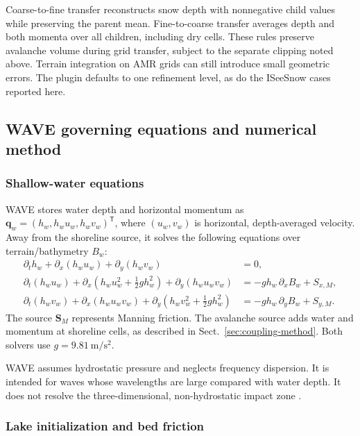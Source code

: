 \documentclass[11pt,a4paper]{article}
\begin{document}
Coarse-to-fine transfer reconstructs snow depth with nonnegative child
values while preserving the parent mean. Fine-to-coarse transfer averages
depth and both momenta over all children, including dry cells. These rules
preserve avalanche volume during grid transfer, subject to the separate
clipping noted above. Terrain integration on AMR grids can still introduce
small geometric errors. The plugin defaults to one refinement level, as do
the ISeeSnow cases reported here.


\newpage
\subsection{WAVE governing equations and numerical method}
\label{sec:wave-method}

\subsubsection{Shallow-water equations}

WAVE stores water depth and horizontal momentum as
$\boldsymbol{q}_w=(h_w,h_wu_w,h_wv_w)^{\mathsf T}$, where $(u_w,v_w)$ is
horizontal, depth-averaged velocity. Away from the shoreline source, it solves
the following equations over terrain/bathymetry $B_w$:
\begin{align}
  \partial_t h_w
    +\partial_x(h_wu_w)+\partial_y(h_wv_w) &=0,
    \label{eq:wave-mass}\\
  \partial_t(h_wu_w)
    +\partial_x\!\left(h_wu_w^2+\tfrac12gh_w^2\right)
    +\partial_y(h_wu_wv_w)
    &=-gh_w\,\partial_xB_w+S_{x,M},
    \label{eq:wave-xmomentum}\\
  \partial_t(h_wv_w)
    +\partial_x(h_wu_wv_w)
    +\partial_y\!\left(h_wv_w^2+\tfrac12gh_w^2\right)
    &=-gh_w\,\partial_yB_w+S_{y,M}.
    \label{eq:wave-ymomentum}
\end{align}
The source $\boldsymbol{S}_M$ represents Manning friction. The avalanche
source adds water and momentum at shoreline cells, as described in
Sect.~\ref{sec:coupling-method}. Both solvers use
$g=\SI{9.81}{\metre\per\second\squared}$.

WAVE assumes hydrostatic pressure and neglects frequency dispersion. It is
intended for waves whose wavelengths are large compared with water depth.
It does not resolve the three-dimensional, non-hydrostatic impact zone
\citep{PoulainEtAl2023}.

\subsubsection{Lake initialization and bed friction}
\end{document}
